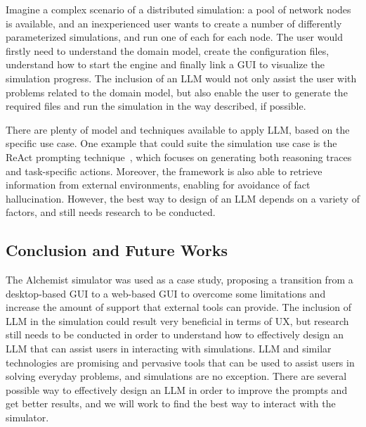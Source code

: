 \documentclass[conference]{IEEEtran}
\begin{document}
Imagine a complex scenario of a distributed simulation: a pool of network nodes is available,
and an inexperienced user wants to create a number of differently parameterized simulations,
and run one of each for each node.
%
The user would firstly need to understand the domain model,
create the configuration files,
understand how to start the engine and finally link a \ac{GUI} to visualize the simulation progress.
%
The inclusion of an \ac{LLM} would not only assist the user with problems related to the domain model,
but also enable the user to generate the required files and run the simulation in the way described,
if possible.
%

There are plenty of model and techniques available to apply \ac{LLM},
based on the specific use case.
%
One example that could suite the simulation use case is the ReAct prompting technique~\cite{DBLP:conf/iclr/YaoZYDSN023},
which focuses on generating both reasoning traces and task-specific actions.
%
Moreover,
the framework is also able to retrieve information from external environments,
enabling for avoidance of fact hallucination.
%
However,
the best way to design of an \ac{LLM} depends on a variety of factors,
and still needs research to be conducted.
\subsection{Conclusion and Future Works}
The Alchemist simulator was used as a case study,
proposing a transition from a desktop-based \ac{GUI} to a web-based \ac{GUI} to overcome some limitations and increase the amount of support that external tools can provide.
%
The inclusion of \ac{LLM} in the simulation could result very beneficial in terms of \ac{UX},
but research still needs to be conducted in order to understand how to effectively design an \ac{LLM} that can assist users in interacting with simulations.
%
\ac{LLM} and similar technologies are promising and pervasive tools that can be used to assist users in solving everyday problems,
and simulations are no exception.
%
%
There are several possible way to effectively design an \ac{LLM} in order to improve the prompts and get better results,
and we will work to find the best way to interact with the simulator.



\vspace{12pt}
\end{document}
